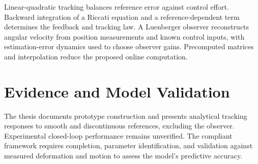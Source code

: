 Linear-quadratic tracking balances reference error against control
effort. Backward integration of a Riccati equation and a
reference-dependent term determines the feedback and tracking law.
A Luenberger observer reconstructs angular velocity from position
measurements and known control inputs, with estimation-error dynamics
used to choose observer gains. Precomputed matrices and interpolation
reduce the proposed online computation.

\section{Evidence and Model Validation}
The thesis documents prototype construction and presents analytical
tracking responses to smooth and discontinuous references, excluding
the observer. Experimental closed-loop performance remains unverified.
The compliant framework requires completion, parameter identification,
and validation against measured deformation and motion to assess the
model's predictive accuracy.




